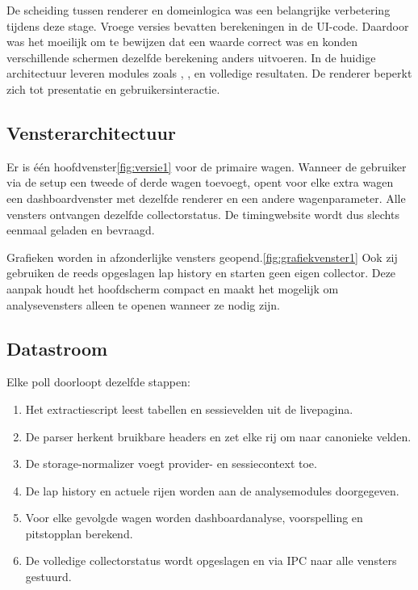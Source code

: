 De scheiding tussen renderer en domeinlogica was een belangrijke verbetering tijdens deze stage.
Vroege versies bevatten berekeningen in de UI-code. Daardoor was het moeilijk om te bewijzen dat een
waarde correct was en konden verschillende schermen dezelfde berekening anders uitvoeren. In de
huidige architectuur leveren modules zoals , ,
 en  volledige resultaten. De renderer beperkt zich
tot presentatie en gebruikersinteractie.

\subsection{Vensterarchitectuur}
Er is één hoofdvenster\ref{fig:versie1} voor de primaire wagen. Wanneer de gebruiker via de setup een tweede of derde
wagen toevoegt, opent voor elke extra wagen een dashboardvenster met dezelfde renderer en een andere
wagenparameter. Alle vensters ontvangen dezelfde collectorstatus. De timingwebsite wordt dus slechts
eenmaal geladen en bevraagd.

Grafieken worden in afzonderlijke vensters geopend.\ref{fig:grafiekvenster1} Ook zij gebruiken de reeds opgeslagen lap
history en starten geen eigen collector. Deze aanpak houdt het hoofdscherm compact en maakt het
mogelijk om analysevensters alleen te openen wanneer ze nodig zijn.

\subsection{Datastroom}
Elke poll doorloopt dezelfde stappen:

\begin{enumerate}
  \item Het extractiescript leest tabellen en sessievelden uit de livepagina.
  \item De parser herkent bruikbare headers en zet elke rij om naar canonieke velden.
  \item De storage-normalizer voegt provider- en sessiecontext toe.
  \item De lap history en actuele rijen worden aan de analysemodules doorgegeven.
  \item Voor elke gevolgde wagen worden dashboardanalyse, voorspelling en pitstopplan berekend.
  \item De volledige collectorstatus wordt opgeslagen en via IPC naar alle vensters gestuurd.
\end{enumerate}


